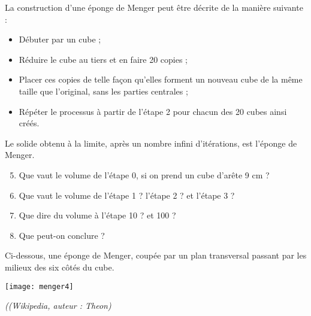 \begin{TP}
La construction d'une éponge de Menger peut être décrite de la manière suivante :
\begin{itemize}
 \item Débuter par un cube ;
 \item Réduire le cube au tiers et en faire 20 copies ;
 \item Placer ces copies de telle façon qu'elles forment un nouveau cube de la même taille que l'original, sans les parties centrales ;
 \item Répéter le processus à partir de l'étape 2 pour chacun des 20 cubes ainsi créés.
 \end{itemize} 
Le solide obtenu à la limite, après un nombre infini d'itérations, est l'éponge de Menger.
\begin{enumerate}
 \setcounter{enumi}{4}
 \item Que vaut le volume de l'étape 0, si on prend un cube d'arête 9 cm ?
 \item Que vaut le volume de l'étape 1 ? l'étape 2 ? et l'étape 3 ?
 \item Que dire du volume à l'étape 10 ? et 100 ?
 \item Que peut-on conclure ?
 \end{enumerate}
Ci-dessous, une éponge de Menger, coupée par un plan transversal passant par les milieux des six côtés du cube.
 \begin{center} \texttt{[image: menger4]} \end{center}
 \qquad \qquad \qquad \qquad \qquad \qquad \qquad \qquad \qquad \qquad \small{\emph{((Wikipedia, auteur : Theon)}}
 
\end{TP}

